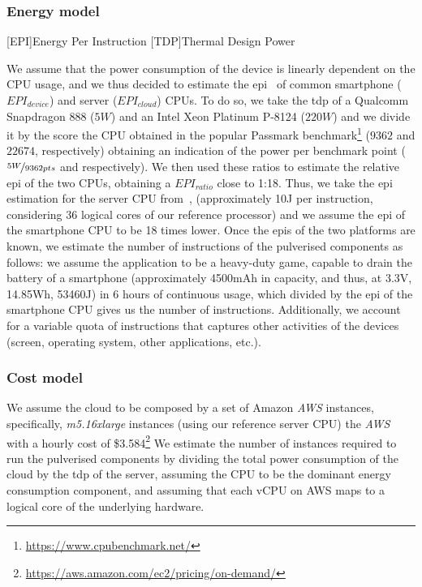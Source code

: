 \documentclass[conference]{IEEEtran}
\begin{document}
\subsubsection{Energy model}

[EPI]{Energy Per Instruction}
[TDP]{Thermal Design Power}

We assume that the power consumption of the device is linearly dependent on the CPU usage,
and we thus decided to estimate the \ac{epi}~\cite{DBLP:conf/islped/ShaoB13}
of common smartphone ($EPI_{device}$) and server ($EPI_{cloud}$) CPUs.
%
To do so, we take the \ac{tdp} of a
Qualcomm Snapdragon 888 ($5W$)
and an
Intel Xeon Platinum P-8124 ($220W$)
and we divide it by the score the CPU obtained in the popular Passmark benchmark\footnote{\url{https://www.cpubenchmark.net/}}
($9362$ and $22674$, respectively)
obtaining an indication of the power per benchmark point
($\nicefrac{5W}{9362pts}$ and  respectively).
%
We then used these ratios to estimate the relative \ac{epi} of the two CPUs,
obtaining a $EPI_{ratio}$ close to 1:18.
%
Thus,
we take the \ac{epi} estimation for the server CPU from~\cite{DBLP:conf/islped/ShaoB13},
(approximately 10J per instruction, considering 36 logical cores of our reference processor)
and we assume the \ac{epi} of the smartphone CPU to be 18 times lower.
%
Once the \acp{epi} of the two platforms are known,
we estimate the number of instructions of the pulverised components as follows:
we assume the application to be a heavy-duty game,
capable to drain the battery of a smartphone
(approximately 4500mAh in capacity, and thus, at 3.3V, 14.85Wh, 53460J)
in 6 hours of continuous usage,
which divided by the \ac{epi} of the smartphone CPU gives us the number of instructions.
%
Additionally,
we account for a variable quota of instructions that captures other activities of the devices
(screen, operating system, other applications, etc.).

\subsubsection{Cost model}
We assume the cloud to be composed by a set of Amazon \emph{AWS} instances,
specifically, \emph{m5.16xlarge} instances
(using our reference server CPU)
the \emph{AWS}
with a hourly cost of \$3.584\footnote{\url{https://aws.amazon.com/ec2/pricing/on-demand/}}
%
We estimate the number of instances required to run the pulverised components by
dividing the total power consumption of the cloud by the \ac{tdp} of the server,
assuming the CPU to be the dominant energy consumption component,
and assuming that each vCPU on AWS maps to a logical core of the underlying hardware.
\end{document}
